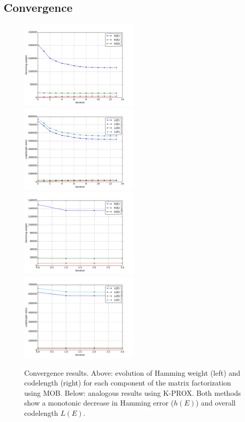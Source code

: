\documentclass[twocolumn]{IEEEtran}
\theoremstyle{definition}
\begin{document}
\subsection{Convergence}
%
\begin{figure}
\includegraphics[width=0.5\textwidth]{fig/conv-mob-einstein-h.pdf}%
\includegraphics[width=0.5\textwidth]{fig/conv-mob-einstein-L.pdf}\\
\includegraphics[width=0.5\textwidth]{fig/conv-kprox-einstein-h.pdf}%
\includegraphics[width=0.5\textwidth]{fig/conv-kprox-einstein-L.pdf}%
\caption{\label{fig:convergence} Convergence results. Above: evolution of Hamming weight (left) and codelength (right) for each component of the matrix factorization using MOB. Below: analogous results using K-PROX. Both methods show a monotonic decrease in Hamming error ($h(E)$) and overall codelength $L(E)$.}
\end{figure}
\end{document}
